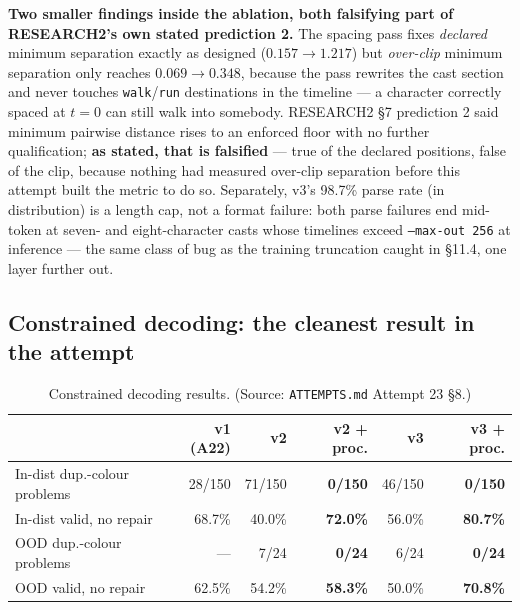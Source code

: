 \documentclass[11pt]{article}
\newcommand{\secsym}{\S}
\begin{document}
\textbf{Two smaller findings inside the ablation, both falsifying part of
RESEARCH2's own stated prediction 2.} The spacing pass fixes
\emph{declared} minimum separation exactly as designed ($0.157
\rightarrow 1.217$) but \emph{over-clip} minimum separation only reaches
$0.069 \rightarrow 0.348$, because the pass rewrites the cast section and
never touches \texttt{walk}/\texttt{run} destinations in the timeline ---
a character correctly spaced at $t{=}0$ can still walk into somebody.
RESEARCH2 \secsym7 prediction 2 said minimum pairwise distance rises to
an enforced floor with no further qualification; \textbf{as stated, that
is falsified} --- true of the declared positions, false of the clip,
because nothing had measured over-clip separation before this attempt
built the metric to do so. Separately, v3's 98.7\% parse rate (in
distribution) is a length cap, not a format failure: both parse failures
end mid-token at seven- and eight-character casts whose timelines exceed
\texttt{--max-out 256} at inference --- the same class of bug as the
training truncation caught in \secsym11.4, one layer further out.

\subsection{Constrained decoding: the cleanest result in the attempt}
\label{sec:constraineddecoding}

\begin{table}[h]
\centering
\small
\caption{Constrained decoding results. (Source: \texttt{ATTEMPTS.md} Attempt 23 \secsym8.)}
\label{tab:constraineddecoding}
\begin{tabular}{@{}L{5.2cm}rrrrr@{}}
\toprule
 & v1 (A22) & v2 & v2 + proc. & v3 & v3 + proc. \\
\midrule
In-dist dup.-colour problems & 28/150 & 71/150 & \textbf{0/150} & 46/150 & \textbf{0/150} \\
In-dist valid, no repair & 68.7\% & 40.0\% & \textbf{72.0\%} & 56.0\% & \textbf{80.7\%} \\
OOD dup.-colour problems & --- & 7/24 & \textbf{0/24} & 6/24 & \textbf{0/24} \\
OOD valid, no repair & 62.5\% & 54.2\% & \textbf{58.3\%} & 50.0\% & \textbf{70.8\%} \\
\bottomrule
\end{tabular}
\end{table}
\end{document}
